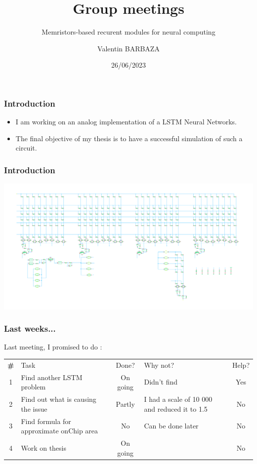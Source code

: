 \documentclass[table]{beamer}
\title{Group meetings}
\subtitle{Memristors-based recurent modules for neural computing}
\author[V. BARBAZA]{Valentin BARBAZA}
\date{26/06/2023}
\begin{document}
\frame{\titlepage}


\begin{frame}
  \frametitle{Introduction}

  \begin{itemize}
      \color{text}
    \item I am working on an analog implementation of a LSTM Neural Networks.
    \item The final objective of my thesis is to have a successful simulation of such a circuit.
  \end{itemize}

\end{frame}


\begin{frame}
  \frametitle{Introduction}
  \centering\includegraphics[width=\textwidth]{lstm/lstm-np}
\end{frame}

\begin{frame}
  \frametitle{Last weeks...}

  Last meeting, I promised to do :

  \centering
  \begin{tabular}{ c m{4cm} c m{2cm} c }
    \rowcolor{firstRow}
    \color{white}\textbf{\#} & \centering\color{white}Task & \color{white}Done? & \color{white}Why not? & \color{white}Help? \\
    1 & Find another LSTM problem & On going & Didn't find & Yes\\
    2 & Find out what is causing the issue & Partly & I had a scale of 10 000 and reduced it to 1.5 & No\\
    3 & Find formula for approximate onChip area & No & Can be done later & No\\
    4 & Work on thesis & On going & & No\\
  \end{tabular}

\end{frame}
\end{document}
